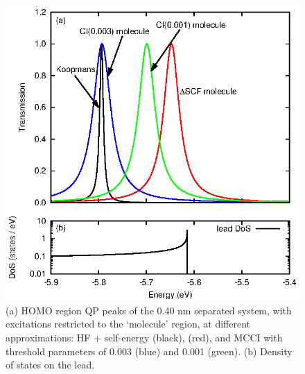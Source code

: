 \begin{figure}
	\begin{center}
		\includegraphics[width=0.9\linewidth]{figures/figure6a_6b}
	\end{center}
	\caption{(a) HOMO region \ac{QP} peaks of the 0.40 nm separated
	         system, with excitations restricted to the `molecule' region,
		 at different approximations: HF + self-energy (black),
		 \dscf (red), and MCCI with threshold parameters of
		 0.003 (blue) and 0.001 (green). (b) Density of states on the
		 lead.}
	\label{fig:all40Ahomo}
\end{figure}

